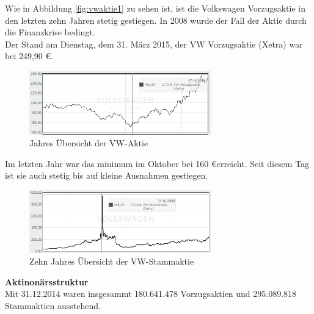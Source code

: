 \documentclass[12pt]{article}
\begin{document}
\noindent
Wie in Abbildung \ref{fig:vwaktie1} zu sehen ist, ist die Volkswagen Vorzugsaktie in den letzten zehn Jahren stetig gestiegen. In 2008 wurde der Fall der Aktie durch die Finanzkrise bedingt.\\
Der Stand am Dienstag, dem 31. März 2015, der VW Vorzugsaktie (Xetra) war bei 249,90 \euro.
\begin{figure}[here!]
\centering
\includegraphics[width=0.7\textwidth]{images/finanzen20151}
\caption{Jahres Übersicht der VW-Aktie \cite{aktienfotos}}
\label{fig:vwaktie3}
\end{figure}\FloatBarrier
\noindent
Im letzten Jahr war das minimum im Oktober bei 160 \euro erreicht. Seit diesem Tag ist sie auch stetig bis auf kleine Ausnahmen gestiegen.
\begin{figure}[here!]
\centering
\includegraphics[width=0.7\textwidth]{images/finanzen2015S}
\caption{Zehn Jahres Übersicht der VW-Stammaktie \cite{aktienfotos}}
\label{fig:vwaktie2}
\end{figure}\FloatBarrier
\noindent
\textbf{Aktinonärsstruktur}\\
Mit 31.12.2014 waren insgesammt 180.641.478 Vorzugsaktien und 295.089.818 Stammaktien ausstehend.\\
\end{document}
